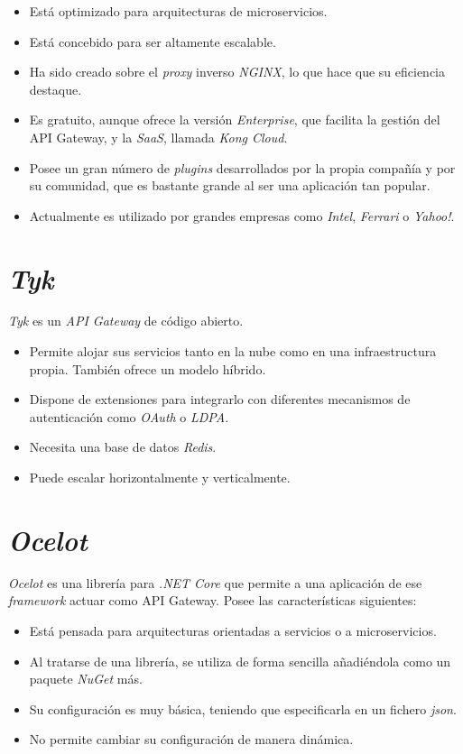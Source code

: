 \documentclass[11pt,spanish,listoffigures]{tfgetsinf}
\begin{document}
\begin{itemize}

	\item Está optimizado para arquitecturas de microservicios.
	\item Está concebido para ser altamente escalable.
	\item Ha sido creado sobre el \emph{proxy} inverso \emph{NGINX}, lo que hace que su eficiencia destaque.
	\item Es gratuito, aunque ofrece la versión \emph{Enterprise}, que facilita la gestión del API Gateway, y la \emph{SaaS}, llamada \emph{Kong Cloud}.
	\item Posee un gran número de \emph{plugins} desarrollados por la propia compañía y por su comunidad, que es bastante grande al ser una aplicación tan popular.
	\item Actualmente es utilizado por grandes empresas como \emph{Intel}, \emph{Ferrari} o \emph{Yahoo!}.

\end{itemize}

\section{\emph{Tyk}}
\emph{Tyk} \cite{Tyk} es un \emph{API Gateway} de código abierto.

\begin{itemize}

	\item Permite alojar sus servicios tanto en la nube como en una infraestructura propia. También ofrece un modelo híbrido.
	\item Dispone de extensiones para integrarlo con diferentes mecanismos de autenticación como \emph{OAuth} o \emph{LDPA}.
	\item Necesita una base de datos \emph{Redis}.
	\item Puede escalar horizontalmente y verticalmente.

\end{itemize}

\section{\emph{Ocelot}}
\emph{Ocelot} \cite{Ocelot} es una librería para \emph{.NET Core} que permite a una aplicación de ese \emph{framework} actuar como API Gateway. Posee las características siguientes:

\begin{itemize}

	\item Está pensada para arquitecturas orientadas a servicios o a microservicios.
	\item Al tratarse de una librería, se utiliza de forma sencilla añadiéndola como un paquete \emph{NuGet} más.
	\item Su configuración es muy básica, teniendo que especificarla en un fichero \emph{json}.
	\item No permite cambiar su configuración de manera dinámica.

\end{itemize}
\end{document}
